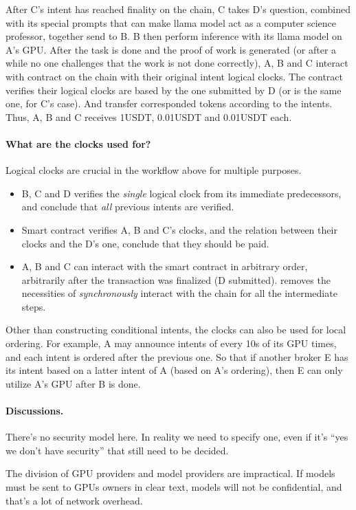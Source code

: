 After C's intent has reached finality on the chain, C takes D's question, combined with its special prompts that can make llama model act as a computer science professor, together send to B.
B then perform inference with its llama model on A's GPU.
After the task is done and the proof of work is generated (or after a while no one challenges that the work is not done correctly), A, B and C interact with \sys contract on the chain with their original intent logical clocks.
The contract verifies their logical clocks are based by the one submitted by D (or is the same one, for C's case).
And transfer corresponded tokens according to the intents.
Thus, A, B and C receives 1USDT, 0.01USDT and 0.01USDT each.

\paragraph{What are the clocks used for?}
Logical clocks are crucial in the workflow above for multiple purposes.
\begin{itemize}
    \item B, C and D verifies the \emph{single} logical clock from its immediate predecessors, and conclude that \emph{all} previous intents are verified.
    \item Smart contract verifies A, B and C's clocks, and the relation between their clocks and the D's one, conclude that they should be paid.
    \item A, B and C can interact with the smart contract in arbitrary order, arbitrarily after the transaction was finalized (\ie D submitted).
    \sys removes the necessities of \emph{synchronously} interact with the chain for all the intermediate steps.
\end{itemize}

Other than constructing conditional intents, the clocks can also be used for local ordering.
For example, A may announce intents of every 10s of its GPU times, and each intent is ordered after the previous one.
So that if another broker E has its intent based on a latter intent of A (based on A's ordering), then E can only utilize A's GPU after B is done.

\paragraph{Discussions.}
There's no security model here.
In reality we need to specify one, even if it's ``yes we don't have security'' that still need to be decided.

The division of GPU providers and model providers are impractical.
If models must be sent to GPUs owners in clear text, models will not be confidential, and that's a lot of network overhead.